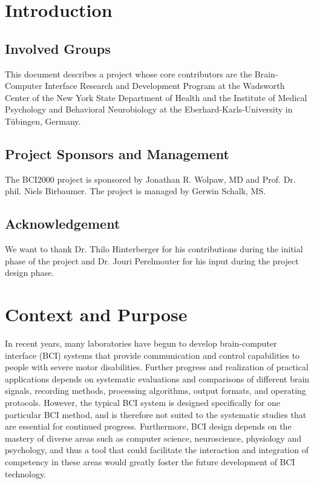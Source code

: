 \documentclass[letterpaper,oneside,12pt]{book}
\begin{document}
\frontmatter


\tableofcontents

\mainmatter

\chapter{Introduction}

\section{Involved Groups}

This document describes a project whose core contributors are the Brain-Computer 
Interface Research and Development Program at the Wadsworth Center of 
the New York State Department of Health and the Institute of Medical 
Psychology and Behavioral Neurobiology at the Eberhard-Karls-University in
T\"ubingen, Germany.

\section{Project Sponsors and Management}

The BCI2000 project is sponsored by Jonathan R. Wolpaw, MD and Prof. Dr. phil. 
Niels Birbaumer. The project is managed by Gerwin Schalk, MS.

\section{Acknowledgement}

We want to thank Dr. Thilo Hinterberger for his contributions during the initial 
phase of the project and Dr. Jouri Perelmouter for his input during the project 
design phase.


\chapter{Context and Purpose}

In recent years, many laboratories have begun to develop brain-computer 
interface (BCI) systems that provide communication and control capabilities to 
people with severe motor disabilities. Further progress and realization of 
practical applications depends on systematic evaluations and comparisons of 
different brain signals, recording methods, processing algorithms, output 
formats, and operating protocols.  However, the typical BCI system is designed 
specifically for one particular BCI method, and is therefore not suited to the 
systematic studies that are essential for continued progress. Furthermore, BCI 
design depends on the mastery of diverse areas such as computer science, 
neuroscience, physiology and psychology, and thus a tool that could facilitate 
the interaction and integration of competency in these areas would greatly 
foster the future development of BCI technology.
\end{document}
